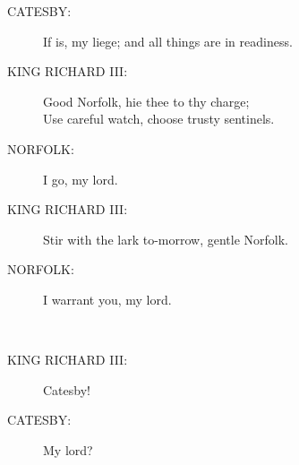 \documentclass{article}
\begin{document}
\begin{description}
\item[CATESBY:] 
\hspace{1pt}If is, my liege; and all things are in readiness.\\
\end{description}
\begin{description}
\item[KING RICHARD III:] 
\hspace{1pt}Good Norfolk, hie thee to thy charge;\\
\hspace{1pt}Use careful watch, choose trusty sentinels.\\
\end{description}
\begin{description}
\item[NORFOLK:] 
\hspace{1pt}I go, my lord.\\
\end{description}
\begin{description}
\item[KING RICHARD III:] 
\hspace{1pt}Stir with the lark to-morrow, gentle Norfolk.\\
\end{description}
\begin{description}
\item[NORFOLK:] 
\hspace{1pt}I warrant you, my lord.\\
\end{description}
\centering{\it [Exit]}\\
\begin{description}
\item[KING RICHARD III:] 
\hspace{1pt}Catesby!\\
\end{description}
\begin{description}
\item[CATESBY:] 
\hspace{1pt}My lord?\\
\end{description}
\end{document}
